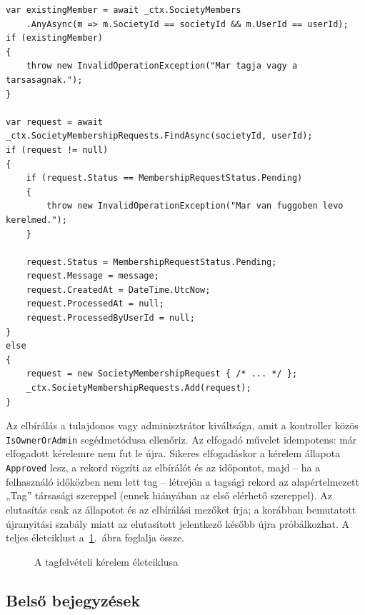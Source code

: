 \begin{lstlisting}[language={[Sharp]C}, caption={A kérelem létrehozása és újranyitása a \texttt{SocietyService} osztályban (kivonat)}, label={lst:join-lifecycle}]
var existingMember = await _ctx.SocietyMembers
    .AnyAsync(m => m.SocietyId == societyId && m.UserId == userId);
if (existingMember)
{
    throw new InvalidOperationException("Mar tagja vagy a tarsasagnak.");
}

var request = await _ctx.SocietyMembershipRequests.FindAsync(societyId, userId);
if (request != null)
{
    if (request.Status == MembershipRequestStatus.Pending)
    {
        throw new InvalidOperationException("Mar van fuggoben levo kerelmed.");
    }

    request.Status = MembershipRequestStatus.Pending;
    request.Message = message;
    request.CreatedAt = DateTime.UtcNow;
    request.ProcessedAt = null;
    request.ProcessedByUserId = null;
}
else
{
    request = new SocietyMembershipRequest { /* ... */ };
    _ctx.SocietyMembershipRequests.Add(request);
}
\end{lstlisting}

Az elbírálás a tulajdonos vagy adminisztrátor kiváltsága, amit a kontroller közös
\texttt{IsOwnerOrAdmin} segédmetódusa ellenőriz. Az elfogadó művelet idempotens: már elfogadott
kérelemre nem fut le újra. Sikeres elfogadáskor a kérelem állapota \texttt{Approved} lesz, a
rekord rögzíti az elbírálót és az időpontot, majd -- ha a felhasználó időközben nem lett tag --
létrejön a tagsági rekord az alapértelmezett „Tag” társasági szereppel (ennek hiányában az első
elérhető szereppel). Az elutasítás csak az állapotot és az elbírálási mezőket írja; a korábban
bemutatott újranyitási szabály miatt az elutasított jelentkező később újra próbálkozhat. A teljes
életciklust a~\ref{fig:request-lifecycle}.~ábra foglalja össze.

\begin{figure}[htbp]
	\centering
	\caption{A tagfelvételi kérelem életciklusa}
	\label{fig:request-lifecycle}
\end{figure}

\subsection{Belső bejegyzések}

